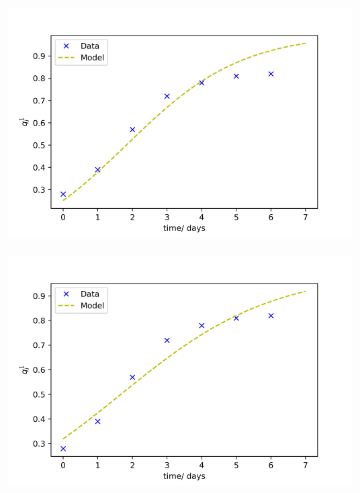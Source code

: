 \documentclass{article}
\begin{document}
\begin{figure}[h]
	\centering
	\begin{subfigure}[t]{0.31\linewidth}
		\centering
		\includegraphics[width = 1.0\linewidth, trim={10 5 30 30}, clip=true]{fit_model1.png}
		\label{fig:fitted1}	
	\end{subfigure}%
	\hspace{0.025\linewidth}
	\begin{subfigure}[t]{0.31\linewidth}
		\centering
		\includegraphics[width = 1.0\linewidth, trim={10 5 30 30}, clip=true]{fit_model.png}
		\label{fig:fitted2}	
	\end{subfigure}%
	\hspace{0.025\linewidth}

\end{figure}
\end{document}
